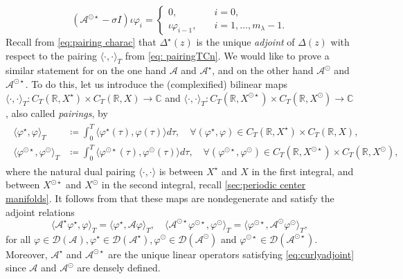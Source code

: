 \documentclass[english]{myarticle}
\begin{document}
\begin{sloppypar}
\begin{equation} \label{eq:ODEeig}
    (\mathcal{A}^{\odot \star} - \sigma I)\iota\varphi_i=
    \begin{cases}
    0, \quad &i = 0,\\
    \iota\varphi_{i-1}, \quad &i=1,\dots,m_\lambda-1.
    \end{cases}
\end{equation}
Recall from \eqref{eq:pairing charac} that $\Delta^\star(z)$ is the unique \emph{adjoint} of $\Delta(z)$ with respect to the pairing $\langle \cdot, \cdot \rangle_T$ from \eqref{eq: pairingTCn}. We would like to prove a similar statement for on the one hand $\mathcal{A}$ and $\mathcal{A}^\star$, and on the other hand $\mathcal{A}^\odot$ and $\mathcal{A}^{\odot \star}$. To do this, let us introduce the (complexified) bilinear maps $\langle \cdot, \cdot \rangle_T : C_T(\mathbb{R},X^\star) \times C_T(\mathbb{R},X) \to \mathbb{C}$ and $\langle \cdot, \cdot \rangle_T : C_T(\mathbb{R},X^{ \odot \star}) \times C_T(\mathbb{R},X^\odot) \to \mathbb{C}$, also called \emph{pairings}, by
\begin{align} \label{eq:pairingT}
\begin{split}
    \langle \varphi^\star, \varphi \rangle_T &\coloneqq \int_0^T \langle \varphi^\star(\tau), \varphi(\tau) \rangle d\tau, \quad \forall (\varphi^\star,\varphi) \in  C_T(\mathbb{R},X^\star) \times  C_T(\mathbb{R},X), \\
    \langle \varphi^{\odot\star}, \varphi^\odot \rangle_T &\coloneqq \int_0^T \langle \varphi^{\odot \star}(\tau), \varphi^{\odot}(\tau) \rangle d\tau, \quad \forall (\varphi^{\odot\star},\varphi^\odot) \in  C_T(\mathbb{R},X^{\odot \star}) \times  C_T(\mathbb{R},X^\odot),
\end{split}
\end{align}
where the natural dual pairing $\langle \cdot, \cdot \rangle$ is between $X^\star$ and $X$ in the first integral, and between $X^{\odot \star}$ and $X^\odot$ in the second integral, recall \cref{sec:periodic center manifolds}. It follows from \cite[Lemma 19 and Proposition 20]{Article1} that these maps are nondegenerate and satisfy the adjoint relations
\begin{equation} \label{eq:curlyadjoint}
    \langle \mathcal{A}^\star \varphi^\star, \varphi \rangle_T = \langle \varphi^\star,\mathcal{A} \varphi \rangle_T, \quad \langle \mathcal{A}^{\odot \star} \varphi^{\odot \star}, \varphi^\odot \rangle_T = \langle \varphi^{\odot \star},\mathcal{A}^\odot \varphi^\odot \rangle_T,
\end{equation}
for all $\varphi \in \mathcal{D}(\mathcal{A}), \varphi^\star \in \mathcal{D}(\mathcal{A}^\star), \varphi^\odot \in \mathcal{D}(\mathcal{A}^\odot)$ and $\varphi^{\odot \star} \in \mathcal{D}(\mathcal{A}^{\odot \star})$. Moreover, $\mathcal{A}^\star$ and $\mathcal{A}^{\odot \star}$ are the unique linear operators satisfying \eqref{eq:curlyadjoint} since $\mathcal{A}$ and $\mathcal{A}^\odot$ are densely defined.


\end{sloppypar}
\end{document}
